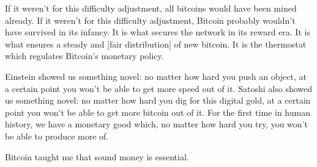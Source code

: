 If it weren't for this difficulty adjustment, all bitcoins would have
been mined already. If it weren't for this difficulty adjustment,
Bitcoin probably wouldn't have survived in its infancy. It is what
secures the network in its reward era. It is what ensures a steady and
[fair distribution] of new bitcoin. It is the thermostat which regulates
Bitcoin's monetary policy.

Einstein showed us something novel: no matter how hard you push an
object, at a certain point you won't be able to get more speed out of
it. Satoshi also showed us something novel: no matter how hard you dig
for this digital gold, at a certain point you won't be able to get more
bitcoin out of it. For the first time in human history, we have a
monetary good which, no matter how hard you try, you won't be able to
produce more of.

Bitcoin taught me that sound money is essential.

%
%
%
%
%
%
%
%
